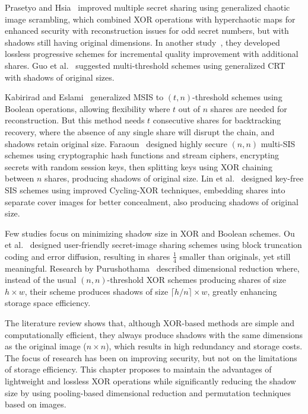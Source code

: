 Prasetyo and Hsia~\cite{prasetyo2019improved} improved multiple secret sharing using generalized chaotic image scrambling, which combined XOR operations with hyperchaotic maps for enhanced security with reconstruction issues for odd secret numbers, but with shadows still having original dimensions. In another study~\cite{prasetyo2019lossless}, they developed lossless progressive schemes for incremental quality improvement with additional shares. Guo et al.~\cite{guo2016} suggested multi-threshold schemes using generalized CRT with shadows of original sizes.

Kabirirad and Eslami~\cite{kabirirad2018t} generalized MSIS to $(t,n)$-threshold schemes using Boolean operations, allowing flexibility where $t$ out of $n$ shares are needed for reconstruction. But this method needs $t$ consecutive shares for backtracking recovery, where the absence of any single share will disrupt the chain, and shadows retain original size. Faraoun~\cite{faraoun2020} designed highly secure $(n,n)$ multi-SIS schemes using cryptographic hash functions and stream ciphers, encrypting secrets with random session keys, then splitting keys using XOR chaining between $n$ shares, producing shadows of original size. Lin et al.~\cite{lin2024} designed key-free SIS schemes using improved Cycling-XOR techniques, embedding shares into separate cover images for better concealment, also producing shadows of original size.

Few studies focus on minimizing shadow size in XOR and Boolean schemes. Ou et al.~\cite{ou2015userfriendly} designed user-friendly secret-image sharing schemes using block truncation coding and error diffusion, resulting in shares $\frac{1}{4}$ smaller than originals, yet still meaningful. Research by Purushothama~\cite{purushothama2024} described dimensional reduction where, instead of the usual $(n,n)$-threshold XOR schemes producing shares of size $h \times w$, their scheme produces shadows of size $\lceil h/n \rceil \times w$, greatly enhancing storage space efficiency.

The literature review shows that, although XOR-based methods are simple and computationally efficient, they always produce shadows with the same dimensions as the original image ($n \times n$), which results in high redundancy and storage costs. The focus of research has been on improving security, but not on the limitations of storage efficiency. This chapter proposes to maintain the advantages of lightweight and lossless XOR operations while significantly reducing the shadow size by using pooling-based dimensional reduction and permutation techniques based on images.


